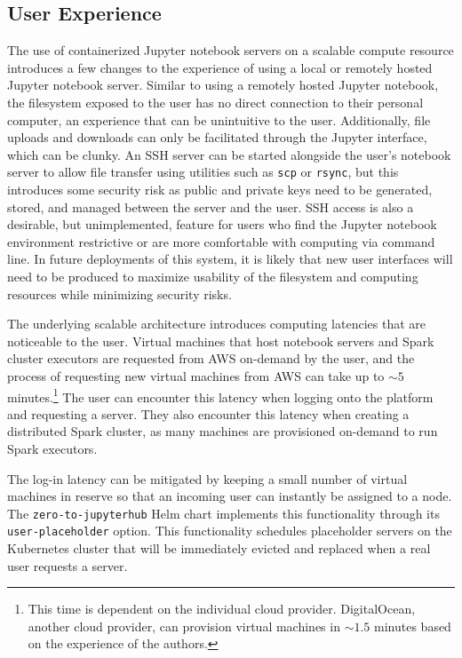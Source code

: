 \documentclass[twocolumn, linenumbers]{aastex631}
\begin{document}
\subsection{User Experience}

The use of containerized Jupyter notebook servers on a scalable compute resource introduces a few changes to the experience of using a local or remotely hosted Jupyter notebook server. Similar to using a remotely hosted Jupyter notebook, the filesystem exposed to the user has no direct connection to their personal computer, an experience that can be unintuitive to the user. Additionally, file uploads and downloads can only be facilitated through the Jupyter interface, which can be clunky. An SSH server can be started alongside the user's notebook server to allow file transfer using utilities such as \texttt{scp} or \texttt{rsync}, but this introduces some security risk as public and private keys need to be generated, stored, and managed between the server and the user. SSH access is also a desirable, but unimplemented, feature for users who find the Jupyter notebook environment restrictive or are more comfortable with computing via command line. In future deployments of this system, it is likely that new user interfaces will need to be produced to maximize usability of the filesystem and computing resources while minimizing security risks.

The underlying scalable architecture introduces computing latencies that are noticeable to the user. Virtual machines that host notebook servers and Spark cluster executors are requested from AWS on-demand by the user, and the process of requesting new virtual machines from AWS can take up to ${\sim}5$ minutes.\footnote{This time is dependent on the individual cloud provider.  DigitalOcean, another cloud provider, can provision virtual machines in ${\sim}1.5$ minutes based on the experience of the authors.} The user can encounter this latency when logging onto the platform and requesting a server. They also encounter this latency when creating a distributed Spark cluster, as many machines are provisioned on-demand to run Spark executors.

The log-in latency can be mitigated by keeping a small number of virtual machines in reserve so that an incoming user can instantly be assigned to a node. The \texttt{zero-to-jupyterhub} Helm chart implements this functionality through its \texttt{user-placeholder} option. This functionality schedules placeholder servers on the Kubernetes cluster that will be immediately evicted and replaced when a real user requests a server.
\end{document}
